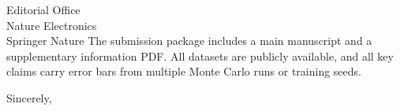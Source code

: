 \documentclass[11pt,a4paper]{letter}
\begin{document}
\begin{letter}{Editorial Office\\Nature Electronics\\Springer Nature}
The submission package includes a main manuscript and a supplementary information PDF. All datasets are publicly available, and all key claims carry error bars from multiple Monte Carlo runs or training seeds.

\closing{Sincerely,}

\end{letter}
\end{document}
